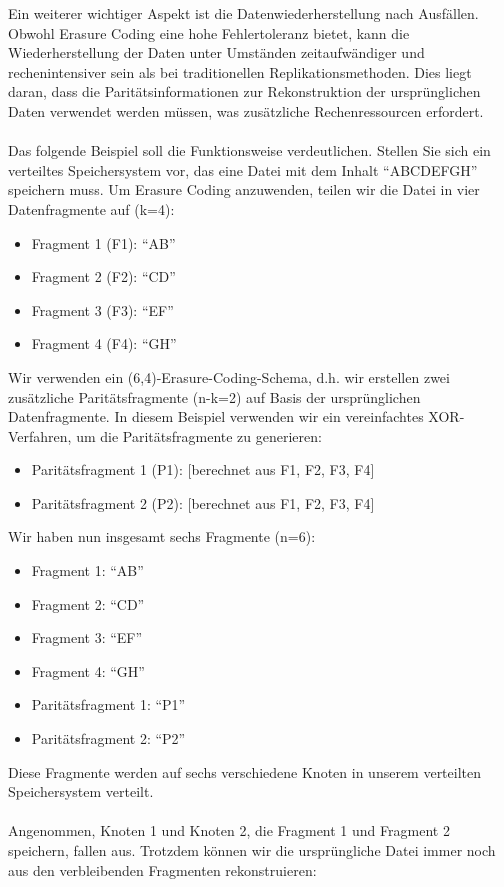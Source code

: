 Ein weiterer wichtiger Aspekt ist die Datenwiederherstellung nach Ausfällen. Obwohl Erasure Coding eine hohe Fehlertoleranz bietet, kann die Wiederherstellung der Daten unter Umständen zeitaufwändiger und rechenintensiver sein als bei traditionellen Replikationsmethoden. Dies liegt daran, dass die Paritätsinformationen zur Rekonstruktion der ursprünglichen Daten verwendet werden müssen, was zusätzliche Rechenressourcen erfordert.
\\\\
Das folgende Beispiel soll die Funktionsweise verdeutlichen. Stellen Sie sich ein verteiltes Speichersystem vor, das eine Datei mit dem Inhalt \enquote{ABCDEFGH} speichern muss. Um Erasure Coding anzuwenden, teilen wir die Datei in vier Datenfragmente auf (k=4):
\begin{itemize}
\item Fragment 1 (F1): \enquote{AB}
\item Fragment 2 (F2): \enquote{CD}
\item Fragment 3 (F3): \enquote{EF}
\item Fragment 4 (F4): \enquote{GH}
\end{itemize}
Wir verwenden ein (6,4)-Erasure-Coding-Schema, d.h. wir erstellen zwei zusätzliche Paritätsfragmente (n-k=2) auf Basis der ursprünglichen Datenfragmente. In diesem Beispiel verwenden wir ein vereinfachtes XOR-Verfahren, um die Paritätsfragmente zu generieren:
\begin{itemize}
\item Paritätsfragment 1 (P1): [berechnet aus F1, F2, F3, F4]
\item Paritätsfragment 2 (P2): [berechnet aus F1, F2, F3, F4]
\end{itemize}
Wir haben nun insgesamt sechs Fragmente (n=6):
\begin{itemize}
\item Fragment 1: \enquote{AB}
\item Fragment 2: \enquote{CD}
\item Fragment 3: \enquote{EF}
\item Fragment 4: \enquote{GH}
\item Paritätsfragment 1: \enquote{P1}
\item Paritätsfragment 2: \enquote{P2}
\end{itemize}  
Diese Fragmente werden auf sechs verschiedene Knoten in unserem verteilten Speichersystem verteilt.
\\\\
Angenommen, Knoten 1 und Knoten 2, die Fragment 1 und Fragment 2 speichern, fallen aus. Trotzdem können wir die ursprüngliche Datei immer noch aus den verbleibenden Fragmenten rekonstruieren:
